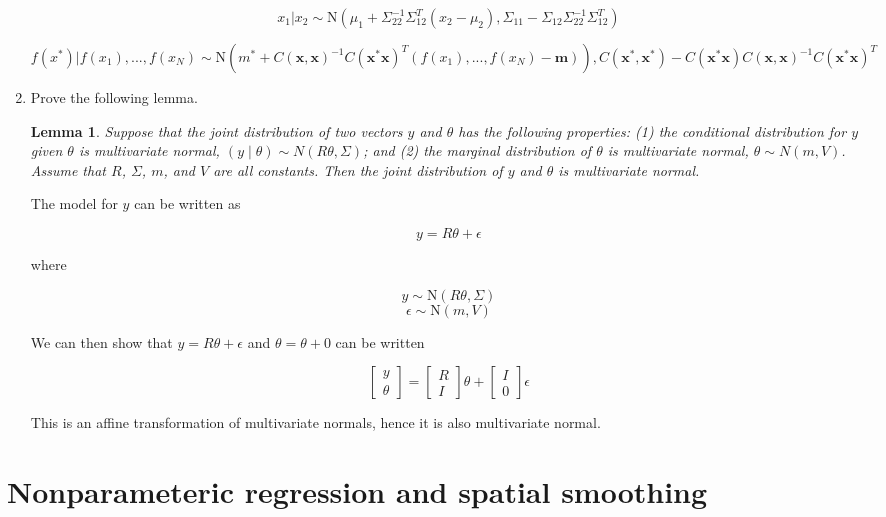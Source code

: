 \documentclass[10pt]{article}
\newtheorem{lemma}[theorem]{Lemma}
\begin{document}
\begin{enumerate}[label=(\Alph*)]
        $$x_1 | x_2 \sim \text{N}(\mu_1 + \Sigma_{22}^{-1} \Sigma_{12}^T(x_2 - \mu_2), \Sigma_{11} - \Sigma_{12} \Sigma_{22}^{-1}\Sigma_{12}^T)$$

        $$f(x^*) | f(x_1), ..., f(x_N) \sim \text{N} \left ( m^* + C(\mathbf{x, x})^{-1}C(\mathbf{x^*x})^T(f(x_1), ...,f(x_N) - \mathbf{m})\right), C(\mathbf{x^*, x^*}) - C(\mathbf{x^*x}) C(\mathbf{x, x})^{-1} C(\mathbf{x^*x})^T $$

        \item Prove the following lemma.

        \begin{lemma}
        Suppose that the joint distribution of two vectors $y$ and $\theta$ has the following properties: (1) the conditional distribution for $y$ given $\theta$ is multivariate normal, $(y \mid \theta) \sim N(R\theta, \Sigma)$; and (2) the marginal distribution of $\theta$ is multivariate normal, $\theta \sim N(m,V)$.  Assume that $R$, $\Sigma$, $m$, and $V$ are all constants.  Then the joint distribution of $y$ and $\theta$ is multivariate normal.
        \end{lemma}

        The model for $y$ can be written as

        $$y = R \theta + \epsilon$$

        where

        $$y \sim \text{N}(R\theta, \Sigma)$$
        $$\epsilon \sim \text{N}(m, V)$$

        We can then show that $y = R \theta + \epsilon$ and $\theta = \theta + 0$ can be written

        $$\begin{bmatrix} y \\ \theta \end{bmatrix} = \begin{bmatrix} R \\ I \end{bmatrix} \theta + \begin{bmatrix} I \\ 0 \end{bmatrix} \epsilon$$

        This is an affine transformation of multivariate normals, hence it is also multivariate normal.

        \end{enumerate}

    \section*{Nonparameteric regression and spatial smoothing}
\end{document}
